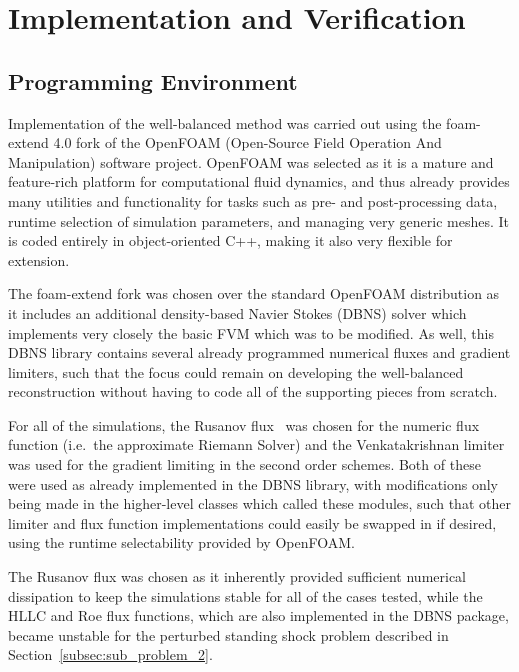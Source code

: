 \chapter{Implementation and Verification}
\label{chap:implementation}

\section{Programming Environment}
\label{sec:environment}

Implementation of the well-balanced method was carried out using the foam-extend 4.0 fork of the OpenFOAM (Open-Source Field Operation And Manipulation) software project. OpenFOAM was selected as it is a mature and feature-rich platform for computational fluid dynamics, and thus already provides many utilities and functionality for tasks such as pre- and post-processing data, runtime selection of simulation parameters, and managing very generic meshes. It is coded entirely in object-oriented C++, making it also very flexible for extension.

The foam-extend fork was chosen over the standard OpenFOAM distribution as it includes an additional density-based Navier Stokes (DBNS) solver which implements very closely the basic FVM which was to be modified. As well, this DBNS library contains several already programmed numerical fluxes and gradient limiters, such that the focus could remain on developing the well-balanced reconstruction without having to code all of the supporting pieces from scratch.

For all of the simulations, the Rusanov flux~\cite{Rusanov1961} was chosen for the numeric flux function (i.e.\ the approximate Riemann Solver) and the Venkatakrishnan limiter~\cite{Venkatakrishnan1993,Venkatakrishnan1995} was used for the gradient limiting in the second order schemes. Both of these were used as already implemented in the DBNS library, with modifications only being made in the higher-level classes which called these modules, such that other limiter and flux function implementations could easily be swapped in if desired, using the runtime selectability provided by OpenFOAM.

The Rusanov flux was chosen as it inherently provided sufficient numerical dissipation to keep the simulations stable for all of the cases tested, while the HLLC and Roe flux functions, which are also implemented in the DBNS package, became unstable for the perturbed standing shock problem described in Section~\ref{subsec:sub_problem_2}.

